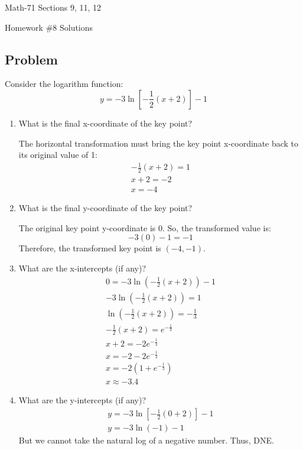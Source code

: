 \documentclass[letterpaper,12pt,fleqn]{article}
\begin{document}
\begin{center}
  \large
  Math-71 Sections 9, 11, 12

  \Large
  Homework \#8 Solutions
\end{center}

\subsection*{Problem}

Consider the logarithm function:
\[y=-3\ln\left[-\frac{1}{2}(x+2)\right]-1\]
\begin{enumerate}[label={\alph*)}]
\item What is the final x-coordinate of the key point?

  The horizontal transformation must bring the key point x-coordinate back to its original value of 1:
  \begin{gather*}
    -\frac{1}{2}(x+2)=1 \\
    x+2=-2 \\
    x=-4
  \end{gather*}
\item What is the final y-coordinate of the key point?

  The original key point y-coordinate is 0.  So, the transformed value is:
  \[-3(0)-1=-1\]
  Therefore, the transformed key point is \((-4,-1)\).
  
\item What are the x-intercepts (if any)?
  \begin{gather*}
    0=-3\ln\left(-\frac{1}{2}(x+2)\right)-1 \\
    -3\ln\left(-\frac{1}{2}(x+2)\right)=1 \\
    \ln\left(-\frac{1}{2}(x+2)\right)=-\frac{1}{3} \\
    -\frac{1}{2}(x+2)=e^{-\frac{1}{3}} \\
    x+2=-2e^{-\frac{1}{3}} \\
    x=-2-2e^{-\frac{1}{3}} \\
    x=-2\left(1+e^{-\frac{1}{3}}\right) \\
    x\approx-3.4
  \end{gather*}
\item What are the y-intercepts (if any)?
  \begin{gather*}
    y=-3\ln\left[-\frac{1}{2}(0+2)\right]-1 \\
    y=-3\ln(-1)-1
  \end{gather*}
  But we cannot take the natural log of a negative number.  Thus, DNE.
  

\end{enumerate}
\end{document}
